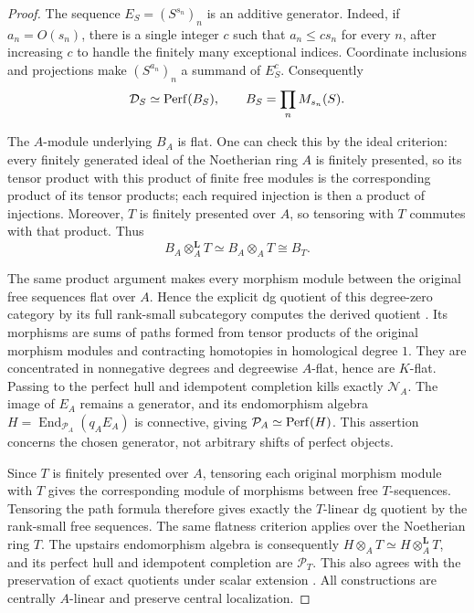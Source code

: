 \begin{proof}
The sequence $E_S=(S^{s_n})_n$ is an additive generator. Indeed, if
$a_n=O(s_n)$, there is a single integer $c$ such that $a_n\leq cs_n$
for every $n$, after increasing $c$ to handle the finitely many
exceptional indices. Coordinate inclusions and projections make
$(S^{a_n})_n$ a summand of $E_S^c$. Consequently
\[
 \mathcal D_S\simeq\operatorname{Perf}(B_S),
 \qquad B_S=\prod_n M_{s_n}(S).
\]

The $A$-module underlying $B_A$ is flat. One can check this by the
ideal criterion: every finitely generated ideal of the Noetherian
ring $A$ is finitely presented, so its tensor product with this
product of finite free modules is the corresponding product of its
tensor products; each required injection is then a product of
injections. Moreover, $T$ is finitely presented over $A$, so tensoring
with $T$ commutes with that product. Thus
\begin{equation}
 B_A\otimes_A^{\mathbf L}T
 \simeq B_A\otimes_A T
 \cong B_T.
 \label{as:product-base-change}
\end{equation}

The same product argument makes every morphism module between the
original free sequences flat over $A$. Hence the explicit dg quotient
of this degree-zero category by its full rank-small subcategory computes
the derived quotient \cite[Section~3.1 and Theorem~3.4]{Drinfeld}.
Its morphisms are sums of paths formed from tensor products of the
original morphism modules and contracting homotopies in homological
degree $1$. They are concentrated in nonnegative degrees and degreewise
$A$-flat, hence are $K$-flat. Passing to the perfect hull and idempotent
completion kills exactly $\mathcal N_A$. The image of $E_A$ remains a
generator, and its endomorphism algebra
$H=\operatorname{End}_{\mathcal P_A}(q_AE_A)$ is connective, giving
$\mathcal P_A\simeq\operatorname{Perf}(H)$. This assertion concerns the chosen
generator, not arbitrary shifts of perfect objects.

Since $T$ is finitely presented over $A$, tensoring each original
morphism module with $T$ gives the corresponding module of morphisms
between free $T$-sequences. Tensoring the path formula therefore gives
exactly the $T$-linear dg quotient by the rank-small free sequences.
The same flatness criterion applies over the Noetherian ring $T$.
The upstairs endomorphism algebra is consequently
$H\otimes_A T\simeq H\otimes_A^{\mathbf L}T$, and its perfect hull
and idempotent completion are $\mathcal P_T$. This also agrees with
the preservation of exact quotients under scalar extension
\cite[Lemma~3.12]{LT}. All constructions are centrally $A$-linear and
preserve central localization.
\end{proof}


